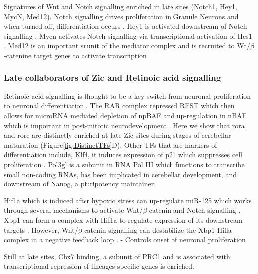 \documentclass[fleqn,10pt,twocolumn]{wlscirep}
\begin{document}
Signatures of Wnt and Notch signalling enriched in late sites (Notch1, Hey1, MycN, Med12). Notch signalling drives proliferation in Granule Neurons and when turned off, differentiation occurs \cite{Adachi2021NotchProgenitors}. Hey1 is activated downstream of Notch signalling \cite{Nandagopal2018DynamicPathway, Yoon2005NotchMutants}. Mycn activates Notch signalling via transcriptional activation of Hes1 \cite{Tong2019Mycn-MeidatedApoptosis}.
Med12 is an important suunit of the mediator complex and is recruited to Wt/$\beta$-catenine target genes to activate transcription \cite{Kim2006MeidatorSignaling}


\subsubsection*{Late collaborators of Zic and  Retinoic acid signalling}
Retinoic acid signalling is thought to be a key switch from neuronal proliferation to neuronal differentiation \cite{Janesick2015RertinoicDifferentiation}. The RAR complex repressed REST which then allows for microRNA mediated depletion of npBAF and up-regulation in nBAF which is important in post-mitotic neurodevelopment \cite{Alfert2019TheDisease}. Here we show that rora and rorc are distinctly enriched at late Zic sites during stages of cerebellar maturation (Figure\ref{fig:DistinctTFs}D). Other TFs that are markers of differentiation include, Klf4, it induces expression of p21 which suppresses cell proliferation \cite{Zhang2000ThePromoter}. Pol3gl is a subunit in RNA Pol III which functions to transcribe small non-coding RNAs, has been implicated in cerebellar development, and downstream of Nanog, a pluripotency maintainer\cite{Wang2020FunctionsDevelopment}.

Hif1a which is induced after hypoxic stress can up-regulate miR-125 which works through several mechanisms to activate Wnt/$\beta$-catenin and Notch signalling \cite{Jiang2020HIF-1-regulatedSignaling}. Xbp1 can form a complex with Hif1a to regulate expression of its downstream targets \cite{Chen2018Xbp1Pathway}. However, Wnt/$\beta$-catenin signalling can destabilize the Xbp1-Hifla complex in a negative feedback loop \cite{Xia2019HypoxicSurvival}.
- Controls onset of neuronal proliferation

Still at late sites, Cbx7 binding,  a subunit of PRC1 and is associated with transcriptional repression of lineages specific genes \cite{Aranda2015RegulationProteins} is enriched. 
\end{document}
